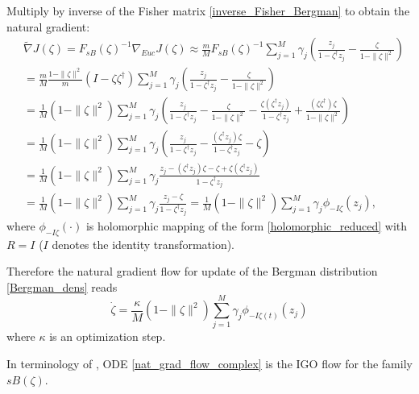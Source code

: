 \documentclass{article}
\theoremstyle{plain}%
\theoremstyle{definition}
\theoremstyle{remark}
\theoremstyle{prop}
\begin{document}
Multiply by inverse of the Fisher matrix \eqref{inverse_Fisher_Bergman} to obtain the natural gradient:
\begin{equation}
\label{Bergman_scores_natural}
\begin{split}
& \tilde \nabla J(\zeta) = F_{sB}(\zeta)^{-1} \nabla_{Euc} J(\zeta) \approx \frac{m}{M} F_{sB}(\zeta)^{-1} \sum_{j=1}^M \gamma_j \left( \frac{z_j}{1 - \zeta^\dagger z_j} - \frac{\zeta}{1 - \| \zeta\|^2} \right) \\
& = \frac{m}{M} \frac{1 - \| \zeta \|^2}{m} (I - \zeta \zeta^\dagger) \sum_{j=1}^M \gamma_j \left( \frac{z_j}{1 - \zeta^\dagger z_j}  - \frac{\zeta}{1 - \| \zeta \|^2}\right) \\
& = \frac{1}{M} (1 -\| \zeta \|^2) \sum_{j=1}^M \gamma_j \left( \frac{z_j}{1 - \zeta^\dagger z_j} - \frac{\zeta}{1 - \| \zeta \|^2} - \frac{\zeta (\zeta^\dagger z_j)}{1 - \zeta^\dagger z_j} + \frac{(\zeta \zeta^\dagger) \zeta}{1 - \| \zeta \|^2} \right) \\
& = \frac{1}{M} (1 -\| \zeta \|^2) \sum_{j=1}^M \gamma_j \left( \frac{z_j}{1 - \zeta^\dagger z_j} - \frac{ (\zeta^\dagger z_j) \zeta}{1 - \zeta^\dagger z_j} - \zeta \right) \\
& = \frac{1}{M} (1 -\| \zeta \|^2) \sum_{j=1}^M \gamma_j \frac{z_j - (\zeta^\dagger z_j) \zeta - \zeta + \zeta (\zeta^\dagger z_j)}{1 - \zeta^\dagger z_j} \\
& = \frac{1}{M} (1 - \| \zeta \|^2) \sum_{j=1}^M \gamma_j \frac{z_j - \zeta}{1 - \zeta^\dagger z_j} = \frac{1}{M} (1 - \| \zeta \|^2) \sum_{j=1}^M \gamma_j \phi_{-I \zeta}(z_j),
\end{split}
\end{equation}
where $\phi_{-I \zeta}(\cdot)$ is holomorphic mapping of the form \eqref{holomorphic_reduced} with $R = I$ ($I$ denotes the identity transformation).

Therefore the natural gradient flow for update of the Bergman distribution \eqref{Bergman_dens} reads
\begin{equation}
\label{nat_grad_flow_complex}
\dot \zeta = \frac{\kappa}{M} (1 - \| \zeta \|^2) \sum_{j=1}^M \gamma_j \phi_{-I \zeta(t)}(z_j)
\end{equation}
where $\kappa$ is an optimization step.

In terminology of \cite{OAAH}, ODE \eqref{nat_grad_flow_complex} is the IGO flow for the family $sB(\zeta)$.

 
\end{document}
